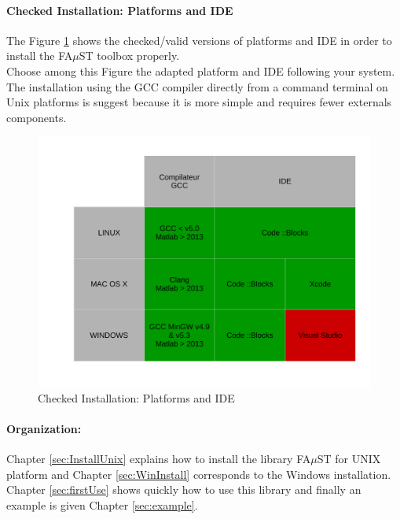 \paragraph{Checked Installation: Platforms and IDE}
The Figure \ref{fig:recapInstall} shows the checked/valid versions of platforms and IDE in order to install the FA$\mu$ST toolbox properly.\\
Choose among this Figure the adapted platform and IDE following your system. 
The installation using the GCC compiler directly from a command terminal on Unix platforms is suggest because it is more simple and requires fewer externals components. 


\begin{figure}[H] %
\centering
\includegraphics[scale=0.5]{images/recapInstall.pdf}
\caption{Checked Installation: Platforms and IDE}
\label{fig:recapInstall}
\end{figure}


\paragraph{Organization:}Chapter \ref{sec:InstallUnix} explains how to install the library FA$\mu$ST for UNIX platform and Chapter \ref{sec:WinInstall} corresponds to the Windows installation. Chapter \ref{sec:firstUse} shows quickly how to use this library and finally an example is given Chapter \ref{sec:example}. 
